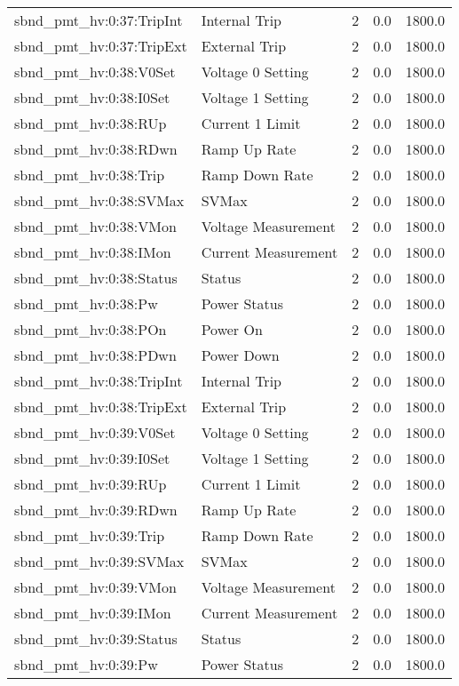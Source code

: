 \begin{center}
\begin{longtable}{l | l l l l }
sbnd\_pmt\_hv:0:37:TripInt & Internal Trip & 2 & 0.0 & 1800.0\\ 
sbnd\_pmt\_hv:0:37:TripExt & External Trip & 2 & 0.0 & 1800.0\\ 
sbnd\_pmt\_hv:0:38:V0Set & Voltage 0 Setting & 2 & 0.0 & 1800.0\\ 
sbnd\_pmt\_hv:0:38:I0Set & Voltage 1 Setting & 2 & 0.0 & 1800.0\\ 
sbnd\_pmt\_hv:0:38:RUp & Current 1 Limit & 2 & 0.0 & 1800.0\\ 
sbnd\_pmt\_hv:0:38:RDwn & Ramp Up Rate & 2 & 0.0 & 1800.0\\ 
sbnd\_pmt\_hv:0:38:Trip & Ramp Down Rate & 2 & 0.0 & 1800.0\\ 
sbnd\_pmt\_hv:0:38:SVMax & SVMax & 2 & 0.0 & 1800.0\\ 
sbnd\_pmt\_hv:0:38:VMon & Voltage Measurement & 2 & 0.0 & 1800.0\\ 
sbnd\_pmt\_hv:0:38:IMon & Current Measurement & 2 & 0.0 & 1800.0\\ 
sbnd\_pmt\_hv:0:38:Status & Status & 2 & 0.0 & 1800.0\\ 
sbnd\_pmt\_hv:0:38:Pw & Power Status & 2 & 0.0 & 1800.0\\ 
sbnd\_pmt\_hv:0:38:POn & Power On & 2 & 0.0 & 1800.0\\ 
sbnd\_pmt\_hv:0:38:PDwn & Power Down & 2 & 0.0 & 1800.0\\ 
sbnd\_pmt\_hv:0:38:TripInt & Internal Trip & 2 & 0.0 & 1800.0\\ 
sbnd\_pmt\_hv:0:38:TripExt & External Trip & 2 & 0.0 & 1800.0\\ 
sbnd\_pmt\_hv:0:39:V0Set & Voltage 0 Setting & 2 & 0.0 & 1800.0\\ 
sbnd\_pmt\_hv:0:39:I0Set & Voltage 1 Setting & 2 & 0.0 & 1800.0\\ 
sbnd\_pmt\_hv:0:39:RUp & Current 1 Limit & 2 & 0.0 & 1800.0\\ 
sbnd\_pmt\_hv:0:39:RDwn & Ramp Up Rate & 2 & 0.0 & 1800.0\\ 
sbnd\_pmt\_hv:0:39:Trip & Ramp Down Rate & 2 & 0.0 & 1800.0\\ 
sbnd\_pmt\_hv:0:39:SVMax & SVMax & 2 & 0.0 & 1800.0\\ 
sbnd\_pmt\_hv:0:39:VMon & Voltage Measurement & 2 & 0.0 & 1800.0\\ 
sbnd\_pmt\_hv:0:39:IMon & Current Measurement & 2 & 0.0 & 1800.0\\ 
sbnd\_pmt\_hv:0:39:Status & Status & 2 & 0.0 & 1800.0\\ 
sbnd\_pmt\_hv:0:39:Pw & Power Status & 2 & 0.0 & 1800.0\\ 

\end{longtable}
\end{center}
